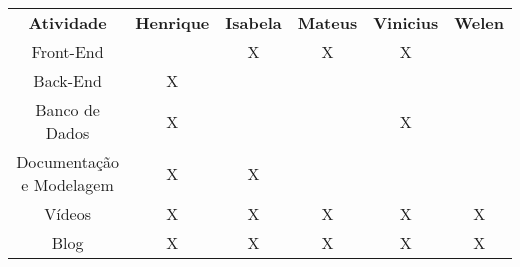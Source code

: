 \begin{table}[]
    \begin{tabular}{|c|c|c|c|c|c|}
        \textbf{Atividade}       & \textbf{Henrique}    & \textbf{Isabela}     & \textbf{Mateus}      & \textbf{Vinicius}    & \multicolumn{1}{c}{\textbf{Welen}} \\
        Front-End                & \multicolumn{1}{l}{} & X                    & X                    & X                    &                                    \\
        Back-End                 & X                    & \multicolumn{1}{l}{} & \multicolumn{1}{l}{} & \multicolumn{1}{l}{} &                                    \\
        Banco de Dados           & X                    & \multicolumn{1}{l}{} & \multicolumn{1}{l}{} & X                    &                                    \\
        Documentação e Modelagem & X                    & X                    & \multicolumn{1}{l}{} & \multicolumn{1}{l}{} &                                    \\
        Vídeos                   & X                    & X                    & X                    & X                    & \multicolumn{1}{c}{X}              \\
        Blog                     & X                    & X                    & X                    & X                    & \multicolumn{1}{c}{X}              \\
    \end{tabular}
\end{table}